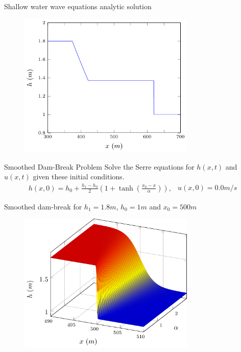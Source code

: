 \documentclass[pdf]{beamer}
\begin{document}
\begin{frame}{Shallow water wave equations analytic solution}
	\begin{figure}
		\includegraphics[width=0.75\textwidth]{../Pics/DBana/SWWEana.pdf}
	\end{figure}
\end{frame}

\begin{frame}{Smoothed Dam-Break Problem}
	Solve the Serre equations for $h(x,t)$ and $u(x,t)$ given these initial conditions.
	\begin{subequations}
		\begin{gather*}
		h(x,0) = h_0 + \frac{h_1 - h_0}{2}\left(1 + \tanh\left(\frac{x_0 - x}{\alpha}\right)\right),
		\end{gather*}
		\begin{gather*}
		u(x,0) = 0.0m/s
		\end{gather*}
	\end{subequations}
\end{frame}

\begin{frame}
	Smoothed dam-break for $h_1 = 1.8m$, $h_0 = 1m$ and $x_0 = 500m$
	\begin{figure}
		\includegraphics[width=0.75\textwidth]{../Pics/pics/explainers/dbsmooth.pdf}
	\end{figure}
\end{frame}
\end{document}
